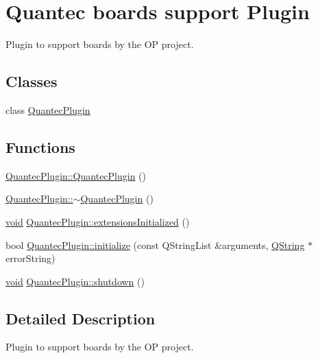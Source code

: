 \hypertarget{group___boards___quantec_plugin}{\section{Quantec boards support Plugin}
\label{group___boards___quantec_plugin}
}


Plugin to support boards by the O\-P project.  


\subsection*{Classes}
\begin{DoxyCompactItemize}
\item 
class \hyperlink{class_quantec_plugin}{Quantec\-Plugin}
\end{DoxyCompactItemize}
\subsection*{Functions}
\begin{DoxyCompactItemize}
\item 
\hyperlink{group___boards___quantec_plugin_ga7e395a732723522846429499416b6660}{Quantec\-Plugin\-::\-Quantec\-Plugin} ()
\item 
\hyperlink{group___boards___quantec_plugin_ga479a3e531eb28d6b2933cba448e348ba}{Quantec\-Plugin\-::$\sim$\-Quantec\-Plugin} ()
\item 
\hyperlink{group___u_a_v_objects_plugin_ga444cf2ff3f0ecbe028adce838d373f5c}{void} \hyperlink{group___boards___quantec_plugin_ga947364f26b2004a6f8706e053e9200c9}{Quantec\-Plugin\-::extensions\-Initialized} ()
\item 
bool \hyperlink{group___boards___quantec_plugin_ga74803b604ba599f20ee7a45dddbd7ead}{Quantec\-Plugin\-::initialize} (const Q\-String\-List \&arguments, \hyperlink{group___u_a_v_objects_plugin_gab9d252f49c333c94a72f97ce3105a32d}{Q\-String} $\ast$error\-String)
\item 
\hyperlink{group___u_a_v_objects_plugin_ga444cf2ff3f0ecbe028adce838d373f5c}{void} \hyperlink{group___boards___quantec_plugin_ga775ecc021e3638b3652f5e49edd2f748}{Quantec\-Plugin\-::shutdown} ()
\end{DoxyCompactItemize}


\subsection{Detailed Description}
Plugin to support boards by the O\-P project. 

